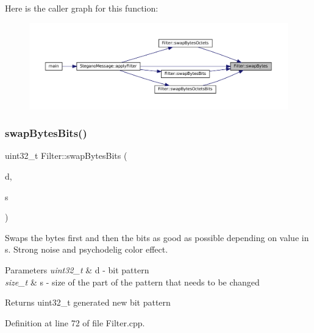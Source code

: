 Here is the caller graph for this function\+:\nopagebreak
\begin{figure}[H]
\begin{center}
\leavevmode
\includegraphics[width=350pt]{classFilter_a9d4f7bd12f0bfdf200abf53d166fd944_icgraph}
\end{center}
\end{figure}
\mbox{\label{classFilter_a42c3e8f730c64a1bcdf187dc0a09082d}} 
\subsubsection{\texorpdfstring{swapBytesBits()}{swapBytesBits()}}
{\footnotesize\ttfamily uint32\+\_\+t Filter\+::swap\+Bytes\+Bits (\begin{DoxyParamCaption}\item[{uint32\+\_\+t}]{d,  }\item[{size\+\_\+t}]{s }\end{DoxyParamCaption})\hspace{0.3cm}{\ttfamily [static]}}



Swaps the bytes first and then the bits as good as possible depending on value in s. Strong noise and psychodelig color effect. 


\begin{DoxyParams}{Parameters}
{\em uint32\+\_\+t} & d -\/ bit pattern \\
\hline
{\em size\+\_\+t} & s -\/ size of the part of the pattern that needs to be changed \\
\hline
\end{DoxyParams}
\begin{DoxyReturn}{Returns}
uint32\+\_\+t generated new bit pattern 
\end{DoxyReturn}


Definition at line 72 of file Filter.\+cpp.

